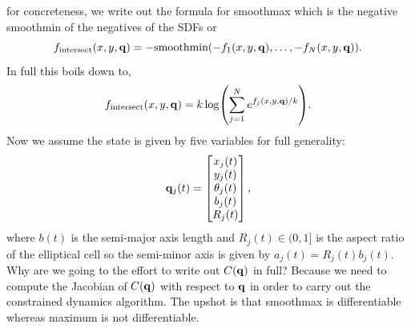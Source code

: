 for concreteness, we write out the formula for smoothmax which is the negative smoothmin of the negatives of the SDFs or
\begin{equation*}
    f_{\textrm{intersect}}(x,y,\vb{q}) = -\textrm{smoothmin}(-f_1(x,y,\vb{q}) , \ldots, -f_N(x,y,\vb{q}) ).
\end{equation*}
In full this boils down to,
\begin{equation*}
    f_{\textrm{intersect}}(x,y,\vb{q}) = k \log( \sum_{j=1}^N e^{f_j(x,y,\vb{q})/k}).
\end{equation*}
Now we assume the state is given by five variables for full generality:
\begin{equation}
\vb{q}_j(t) = 
\begin{bmatrix}
    x_j (t) \\
    y_j(t) \\
    \theta_j(t) \\
    b_j(t) \\
    R_j(t)
\end{bmatrix},
\end{equation}
where $b(t)$ is the semi-major axis length and $R_j(t) \in (0,1]$ is the aspect ratio of the elliptical cell so the semi-minor axis is given by $a_j(t) = R_j(t) b_j(t)$. 
Why are we going to the effort to write out $C(\vb{q})$ in full? Because we need to compute the Jacobian of $C(\vb{q})$ with
respect to $\vb{q}$ in order to carry out the constrained dynamics algorithm. The upshot is that smoothmax is differentiable
whereas maximum is not differentiable. 

